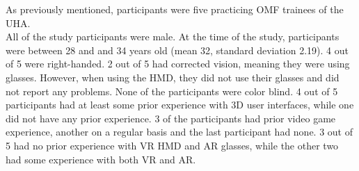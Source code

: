 As previously mentioned, participants were five practicing OMF trainees of the UHA.
\\ All of the study participants were male.
At the time of the study, participants were between 28 and and 34 years old (mean 32, standard deviation 2.19).
4 out of 5 were right-handed.
2 out of 5 had corrected vision, meaning they were using glasses.
However, when using the HMD, they did not use their glasses and did not report any problems.
None of the participants were color blind.
4 out of 5 participants had at least some prior experience with 3D user interfaces, while one did not have any prior experience.
3 of the participants had prior video game experience, another on a regular basis and the last participant had none.
3 out of 5 had no prior experience with VR HMD and AR glasses, while the other two had some experience with both VR and AR.